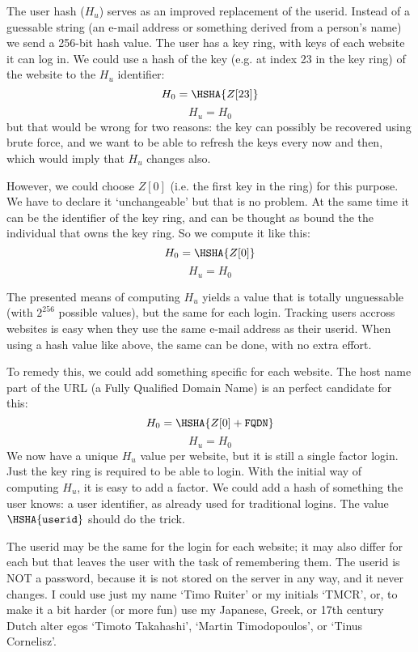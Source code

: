 The user hash (\(H_u\)) serves as an improved replacement of the userid.
Instead of a guessable string
(an e-mail address or something derived from a person's name)
we send a 256-bit hash value.
The user has a key ring, with keys of each website it can log in.
We could use a hash of the key
(e.g. at index 23 in the key ring)
of the website to the \(H_u\) identifier:
\[H_0 = \HSHA{Z[23]}\]
\[H_u = H_0\]
but that would be wrong for two reasons:
the key can possibly be recovered using brute force,
and we want to be able to refresh the keys every now and then, which would imply that \(H_u\) changes also.
\par
However, we could choose \(Z[0]\)
(i.e. the first key in the ring)
for this purpose.
We have to declare it `unchangeable' but that is no problem.
At the same time it can be the identifier of the key ring, and can be thought as bound the the individual that owns the key ring.
So we compute it like this:
\[H_0 = \HSHA{Z[0]}\]
\[H_u = H_0\]
\par
The presented means of computing \(H_u\) yields a value that is totally unguessable (with \(2^{256}\) possible values), but the same for each login.
Tracking users accross websites is easy when they use the same e-mail address as their userid.
When using a hash value like above, the same can be done, with no extra effort.
\par
To remedy this, we could add something specific for each website.
The host name part of the URL
(a Fully Qualified Domain Name)
is an perfect candidate for this:
\[H_0 = \HSHA{Z[0] + \mathtt{FQDN}}\]
\[H_u = H_0\]
We now have a unique \(H_u\) value per website, but it is still a single factor login.
Just the key ring is required to be able to login.
With the initial way of computing \(H_u\), it is easy to add a factor.
We could add a hash of something the user knows: a user identifier, as already used for traditional logins.
The value \(\HSHA{\mathtt{userid}}\) should do the trick.
\par
The userid may be the same for the login for each website;
it may also differ for each but that leaves the user with the task of remembering them.
The userid is NOT a password, because it is not stored on the server in any way, and it never changes.
I could use just my name `Timo Ruiter' or my initials `TMCR', or, to make it a bit harder (or more fun)
use my Japanese, Greek, or 17th century Dutch alter egos `Timoto Takahashi', `Martin Timodopoulos', or `Tinus Cornelisz'. 

